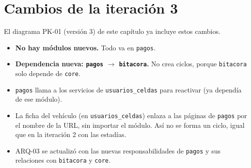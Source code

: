 \section{Cambios de la iteración 3}
El diagrama PK-01 (versión 3) de este capítulo ya incluye estos cambios.





\begin{itemize}
  \item \textbf{No hay módulos nuevos.} Todo va en \texttt{pagos}.
  \item \textbf{Dependencia nueva: \texttt{pagos} $\rightarrow$ \texttt{bitacora}.} No crea ciclos, porque \texttt{bitacora} solo depende de \texttt{core}.
  \item \texttt{pagos} llama a los servicios de \texttt{usuarios\_celdas} para reactivar (ya dependía de ese módulo).
  \item La ficha del vehículo (en \texttt{usuarios\_celdas}) enlaza a las páginas de \texttt{pagos} por el nombre de la URL, sin importar el módulo. Así no se forma un ciclo, igual que en la iteración 2 con las estadías.
  \item ARQ-03 se actualizó con las nuevas responsabilidades de \texttt{pagos} y sus relaciones con \texttt{bitacora} y \texttt{core}.
\end{itemize}


